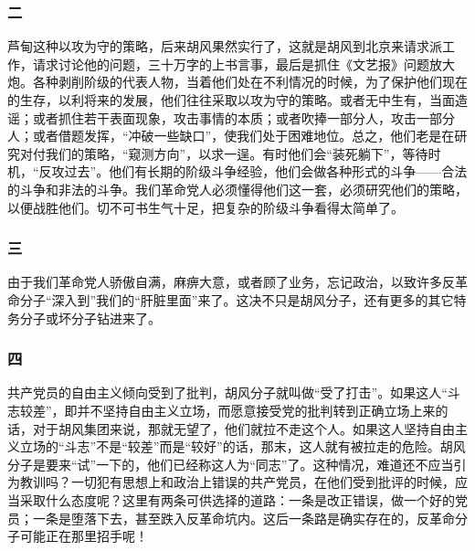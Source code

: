 \documentclass[cn,11pt,chinese]{elegantbook}
\def\myformat#1{\hfil\hfil #1}
\begin{document}
\subsubsection*{\myformat{二}}
芦甸这种以攻为守的策略，后来胡风果然实行了，这就是胡风到北京来请求派工作，请求讨论他的问题，三十万字的上书言事，最后是抓住《文艺报》问题放大炮。各种剥削阶级的代表人物，当着他们处在不利情况的时候，为了保护他们现在的生存，以利将来的发展，他们往往采取以攻为守的策略。或者无中生有，当面造谣；或者抓住若干表面现象，攻击事情的本质；或者吹捧一部分人，攻击一部分人；或者借题发挥，“冲破一些缺口”，使我们处于困难地位。总之，他们老是在研究对付我们的策略，“窥测方向”，以求一逞。有时他们会“装死躺下”，等待时机，“反攻过去”。他们有长期的阶级斗争经验，他们会做各种形式的斗争——合法的斗争和非法的斗争。我们革命党人必须懂得他们这一套，必须研究他们的策略，以便战胜他们。切不可书生气十足，把复杂的阶级斗争看得太简单了。\\
\subsubsection*{\myformat{三}}
由于我们革命党人骄傲自满，麻痹大意，或者顾了业务，忘记政治，以致许多反革命分子“深入到”我们的“肝脏里面”来了。这决不只是胡风分子，还有更多的其它特务分子或坏分子钻进来了。\\
\subsubsection*{\myformat{四}}
共产党员的自由主义倾向受到了批判，胡风分子就叫做“受了打击”。如果这人“斗志较差”，即并不坚持自由主义立场，而愿意接受党的批判转到正确立场上来的话，对于胡风集团来说，那就无望了，他们就拉不走这个人。如果这人坚持自由主义立场的“斗志”不是“较差”而是“较好”的话，那末，这人就有被拉走的危险。胡风分子是要来“试”一下的，他们已经称这人为“同志”了。这种情况，难道还不应当引为教训吗？一切犯有思想上和政治上错误的共产党员，在他们受到批评的时候，应当采取什么态度呢？这里有两条可供选择的道路：一条是改正错误，做一个好的党员；一条是堕落下去，甚至跌入反革命坑内。这后一条路是确实存在的，反革命分子可能正在那里招手呢！\\
\end{document}
